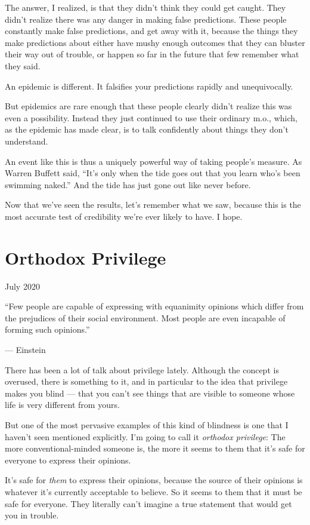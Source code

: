 \documentclass[12pt]{book}
\begin{document}
The answer, I realized, is that they didn't think they could get caught.
They didn't realize there was any danger in making false predictions.
These people constantly make false predictions, and get away with it,
because the things they make predictions about either have mushy enough
outcomes that they can bluster their way out of trouble, or happen so
far in the future that few remember what they said.

An epidemic is different. It falsifies your predictions rapidly and
unequivocally.

But epidemics are rare enough that these people clearly didn't realize
this was even a possibility. Instead they just continued to use their
ordinary m.o., which, as the epidemic has made clear, is to talk
confidently about things they don't understand.

An event like this is thus a uniquely powerful way of taking people's
measure. As Warren Buffett said, ``It's only when the tide goes out that
you learn who's been swimming naked.'' And the tide has just gone out
like never before.

Now that we've seen the results, let's remember what we saw, because
this is the most accurate test of credibility we're ever likely to have.
I hope.
\chapter{Orthodox Privilege}

July 2020

``Few people are capable of expressing with equanimity opinions which
differ from the prejudices of their social environment. Most people are
even incapable of forming such opinions.''

--- Einstein

There has been a lot of talk about privilege lately. Although the
concept is overused, there is something to it, and in particular to the
idea that privilege makes you blind --- that you can't see things that
are visible to someone whose life is very different from yours.

But one of the most pervasive examples of this kind of blindness is one
that I haven't seen mentioned explicitly. I'm going to call it
\emph{orthodox privilege}: The more conventional-minded someone is, the
more it seems to them that it's safe for everyone to express their
opinions.

It's safe for \emph{them} to express their opinions, because the source
of their opinions is whatever it's currently acceptable to believe. So
it seems to them that it must be safe for everyone. They literally can't
imagine a true statement that would get you in trouble.
\end{document}
